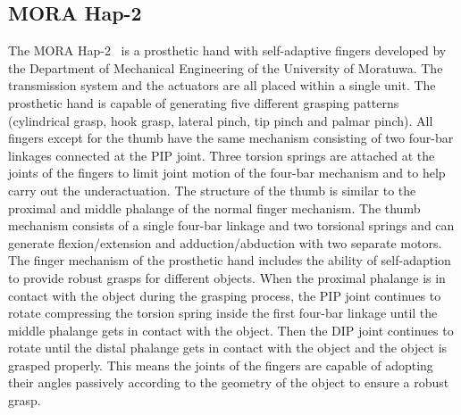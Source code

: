 \documentclass[a4paper, 10pt, conference]{ieeeconf}      %
\begin{document}
\subsection{MORA Hap-2}

The MORA Hap-2~\cite{morahap2} is a prosthetic hand with self-adaptive fingers developed by the Department of Mechanical Engineering of the University of Moratuwa. The transmission system and the actuators are all placed within a single unit. The prosthetic hand is capable of generating five different grasping patterns (cylindrical grasp, hook grasp, lateral pinch, tip pinch and palmar pinch). All fingers except for the thumb have the same mechanism consisting of two four-bar linkages connected at the PIP joint. Three torsion springs are attached at the joints of the fingers to limit joint motion of the four-bar mechanism and to help carry out the underactuation. The structure of the thumb is similar to the proximal and middle phalange of the normal finger mechanism. The thumb mechanism consists of a single four-bar linkage and two torsional springs and can generate flexion/extension and adduction/abduction with two separate motors. The finger mechanism of the prosthetic hand includes the ability of self-adaption to provide robust grasps for different objects. When the proximal phalange is in contact with the object during the grasping process, the PIP joint continues to rotate compressing the torsion spring inside the first four-bar linkage until the middle phalange gets in contact with the object. Then the DIP joint continues to rotate until the distal phalange gets in contact with the object and the object is grasped properly. This means the joints of the fingers are capable of adopting their angles passively according to the geometry of the object to ensure a robust grasp.



\end{document}
